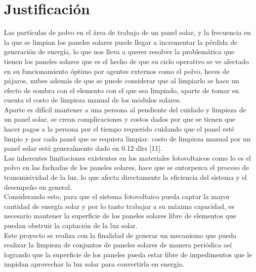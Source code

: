 \chapter{Justificación}\label{cap2}
Las partículas de polvo en el área de trabajo de un panel solar, y la frecuencia en la que se limpian los paneles solares puede llegar a incrementar la pérdida de generación de energía, lo que nos lleva a querer resolver la problemática que tienen los paneles solares que es el hecho de que su ciclo operativo se ve afectado en su funcionamiento óptimo por agentes externos como el polvo, heces de pájaros, nubes además de que se puede considerar que al limpiarlo se hace un efecto de sombra con el elemento con el que sea limpiado, aparte de tomar en cuenta el costo de limpieza manual de los módulos solares.\\

Aparte es difícil mantener a una persona al pendiente del cuidado y limpieza de un panel solar, se crean complicaciones y costos dados por que se tienen que hacer pagos a la persona por el tiempo requerido cuidando que el panel esté limpio y por cada panel que se requiera limpiar. costo de limpieza manual por un panel solar está generalmente dado en 0.12 dlrs [11].\\

Las inherentes limitaciones existentes en los materiales fotovoltaicos como lo es el polvo en las fachadas de los paneles solares, hace que se entorpezca el proceso de transmisividad de la luz, lo que afecta directamente la eficiencia del sistema y el desempeño en general.\\

Considerando esto, para que el sistema fotovoltaico pueda captar la mayor cantidad de energía solar y por lo tanto trabajar a su máxima capacidad, es necesario mantener la superficie de los paneles solares libre de elementos que puedan obstruir la captación de la luz solar.\\

Este proyecto se realiza con la finalidad de generar un mecanismo que pueda realizar la limpieza de conjuntos de paneles solares de manera periódica así logrando que la superficie de los paneles pueda estar libre de impedimentos que le impidan aprovechar la luz solar para convertirla en energía.





